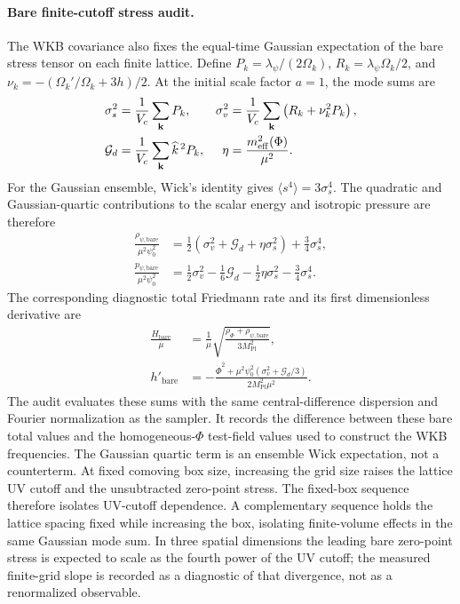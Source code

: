 \documentclass[epj]{svjour}
\begin{document}
\paragraph{Bare finite-cutoff stress audit.}
The WKB covariance also fixes the equal-time Gaussian expectation of the
bare stress tensor on each finite lattice. Define
$P_k=\lambda_\psi/(2\Omega_k)$,
$R_k=\lambda_\psi\Omega_k/2$, and
$\nu_k=-(\Omega_k'/\Omega_k+3h)/2$. At the initial scale factor
$a=1$, the mode sums are
\begin{align}
\sigma_s^2&=\frac{1}{V_c}\sum_{\mathbf{k}}P_k,
&
\sigma_v^2&=\frac{1}{V_c}\sum_{\mathbf{k}}
\left(R_k+\nu_k^2P_k\right),
\\
\mathcal G_d&=\frac{1}{V_c}\sum_{\mathbf{k}}
\widehat{k}^{\,2}P_k,
&
\eta&=\frac{m_{\rm eff}^2(\Phi)}{\mu^2}.
\label{eq:ptum_wkb_bare_variances}
\end{align}
For the Gaussian ensemble, Wick's identity gives
$\langle s^4\rangle=3\sigma_s^4$. The quadratic and Gaussian-quartic
contributions to the scalar energy and isotropic pressure are therefore
\begin{align}
\frac{\rho_{\psi,\mathrm{bare}}}{\mu^2\psi_0^2}
&=\frac12\left(\sigma_v^2+\mathcal G_d+\eta\sigma_s^2\right)
+\frac34\sigma_s^4,
\\
\frac{p_{\psi,\mathrm{bare}}}{\mu^2\psi_0^2}
&=\frac12\sigma_v^2-\frac16\mathcal G_d
-\frac12\eta\sigma_s^2-\frac34\sigma_s^4.
\label{eq:ptum_wkb_bare_stress}
\end{align}
The corresponding diagnostic total Friedmann rate and its first
dimensionless derivative are
\begin{align}
\frac{H_{\mathrm{bare}}}{\mu}
&=\frac{1}{\mu}
\sqrt{\frac{\rho_\Phi+\rho_{\psi,\mathrm{bare}}}
{3M_{\mathrm{Pl}}^2}},
\\
h'_{\mathrm{bare}}
&=-\frac{\dot\Phi^2+\mu^2\psi_0^2
\left(\sigma_v^2+\mathcal G_d/3\right)}
{2M_{\mathrm{Pl}}^2\mu^2}.
\label{eq:ptum_wkb_bare_friedmann}
\end{align}
The audit evaluates these sums with the same central-difference
dispersion and Fourier normalization as the sampler. It records the
difference between these bare total values and the homogeneous-$\Phi$
test-field values used to construct the WKB frequencies. The Gaussian
quartic term is an ensemble Wick expectation, not a counterterm.
At fixed comoving box size, increasing the grid size raises the lattice
UV cutoff and the unsubtracted zero-point stress. The fixed-box sequence
therefore isolates UV-cutoff dependence. A complementary sequence holds
the lattice spacing fixed while increasing the box, isolating finite-volume
effects in the same Gaussian mode sum. In three spatial dimensions the
leading bare zero-point stress is expected to scale as the fourth power
of the UV cutoff; the measured finite-grid slope is recorded as a
diagnostic of that divergence, not as a renormalized observable.
\end{document}
